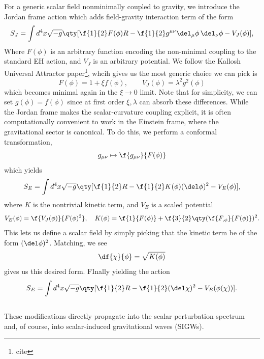 For a generic scalar field nonminimally coupled to gravity, we introduce the Jordan frame action which adds field-gravity interaction term of the form
\begin{equation}
    S_J=\int d^4 x \sqrt{-g}\qty[\f{1}{2} F(\phi) R-\f{1}{2} g^{\mu \nu} \del_\mu \phi \,\del_\nu \phi-V_J(\phi)],
\end{equation}
Where $F(\phi)$ is an arbitrary function encoding the non-minimal coupling to the standard EH action, and $V_J$ is an arbitrary potential. We follow the Kallosh Universal Attractor paper\footnote{cite}, whcih gives us the most generic choice we can pick is 
\begin{equation}
    F(\phi)=1+\xi f(\phi), \qquad V_J(\phi)=\lambda^2g^2(\phi)
\end{equation}
which becomes minimal again in the $\xi\to0$ limit. Note that for simplicity, we can set $g(\phi)=f(\phi)$ since at first order $\xi,\lambda$ can absorb these differences. While the Jordan frame makes the scalar-curvature coupling explicit, it is often computationally convenient to work in the Einstein frame, where the gravitational sector is canonical. To do this, we perform a conformal transformation,
\begin{equation}
    g_{\mu\nu}\mapsto \f{g_{\mu\nu}}{F(\phi)}
\end{equation}
which yields
\begin{equation}
    S_E=\int d^4 x \sqrt{-g}\qty[\f{1}{2} R-\f{1}{2} K(\phi)(\del \phi)^2-V_E(\phi)],
\end{equation}
where $K$ is the nontrivial kinetic term, and $V_E$ is a scaled potential
\begin{equation}
    V_E(\phi)=\f{V_J(\phi)}{F(\phi)^2}, \quad K(\phi)=\f{1}{F(\phi)}+\f{3}{2}\qty(\f{F_{, \phi}}{F(\phi)})^2 .
\end{equation}
This lets us define a scalar field by simply picking that the kinetic term be of the form $(\del\phi)^2$. Matching, we see
\begin{equation}
    \df{\chi}{\phi}=\sqrt{K(\phi)}
\end{equation}
gives us this desired form. FInally yielding the action
\begin{equation}
    S_E=\int d^4 x \sqrt{-g}\qty[\f{1}{2} R-\f{1}{2} (\del \chi)^2-V_E(\phi(\chi))].
\end{equation}

\[\] 

These modifications directly propagate into the scalar perturbation spectrum and, of course, into scalar-induced gravitational waves (SIGWs).



